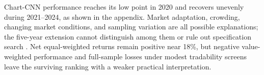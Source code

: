 Chart-CNN performance reaches its low point in 2020 and recovers unevenly during 2021--2024, as shown in the appendix. Market adaptation, crowding, changing market conditions, and sampling variation are all possible explanations; the five-year extension cannot distinguish among them or rule out specification search \parencite{kaczmarekErodingNonScalableCNN2025,mcleanAcademicResearchDestroy2016}. Net equal-weighted returns remain positive near 18\%, but negative value-weighted performance and full-sample losses under modest tradability screens leave the surviving ranking with a weaker practical interpretation.

